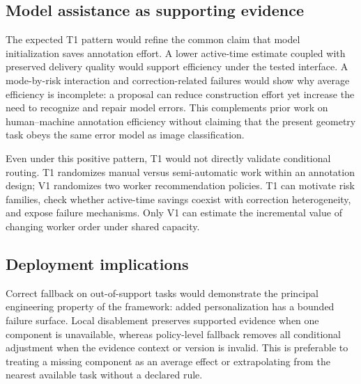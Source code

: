 \subsection{Model assistance as supporting evidence}


\expectedresult{} The expected T1 pattern would refine the common claim that model initialization saves annotation effort. A lower active-time estimate coupled with preserved delivery quality would support efficiency under the tested interface. A mode-by-risk interaction and correction-related failures would show why average efficiency is incomplete: a proposal can reduce construction effort yet increase the need to recognize and repair model errors. This complements prior work on human--machine annotation efficiency \cite{branson2017lean,vanhorn2018leanmulticlass,liao2021goodpractices} without claiming that the present geometry task obeys the same error model as image classification.

\expectedresult{} Even under this positive pattern, T1 would not directly validate conditional routing. T1 randomizes manual versus semi-automatic work within an annotation design; V1 randomizes two worker recommendation policies. T1 can motivate risk families, check whether active-time savings coexist with correction heterogeneity, and expose failure mechanisms. Only V1 can estimate the incremental value of changing worker order under shared capacity.

\subsection{Deployment implications}


\expectedresult{} Correct fallback on out-of-support tasks would demonstrate the principal engineering property of the framework: added personalization has a bounded failure surface. Local disablement preserves supported evidence when one component is unavailable, whereas policy-level fallback removes all conditional adjustment when the evidence context or version is invalid. This is preferable to treating a missing component as an average effect or extrapolating from the nearest available task without a declared rule.

